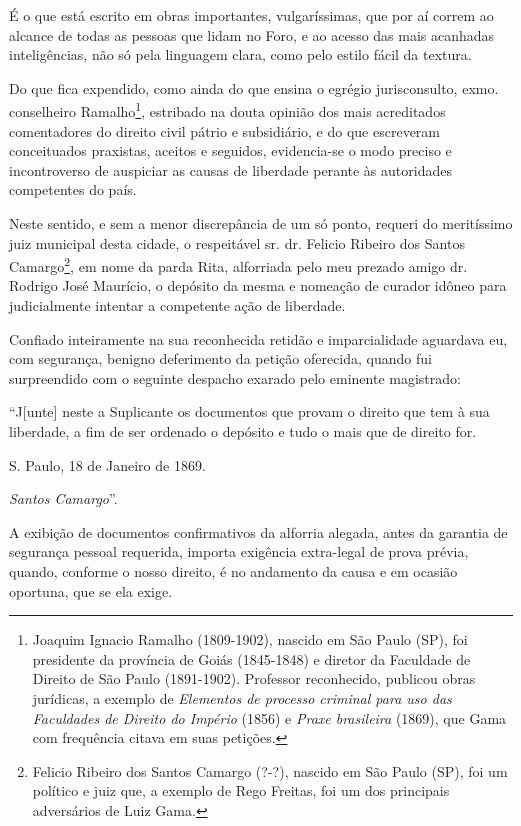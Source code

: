É o que está escrito em obras importantes, vulgaríssimas, que por aí
correm ao alcance de todas as pessoas que lidam no Foro, e ao acesso das
mais acanhadas inteligências, não só pela linguagem clara, como pelo
estilo fácil da textura.

Do que fica expendido, como ainda do que ensina o egrégio jurisconsulto,
exmo. conselheiro Ramalho\footnote{Joaquim Ignacio Ramalho
  (1809-1902), nascido em São Paulo (SP), foi presidente da província de
  Goiás (1845-1848) e diretor da Faculdade de Direito de São Paulo
  (1891-1902). Professor reconhecido, publicou obras jurídicas, a
  exemplo de \emph{Elementos de processo criminal para uso das
  Faculdades de Direito do Império} (1856) e \emph{Praxe brasileira}
  (1869), que Gama com frequência citava em suas petições.}, estribado
na douta opinião dos mais acreditados comentadores do direito civil
pátrio e subsidiário, e do que escreveram conceituados praxistas,
aceitos e seguidos, evidencia-se o modo preciso e incontroverso de
auspiciar as causas de liberdade perante às autoridades competentes do
país.

Neste sentido, e sem a menor discrepância de um só ponto, requeri do
meritíssimo juiz municipal desta cidade, o respeitável sr. dr. Felicio
Ribeiro dos Santos Camargo\footnote{Felicio Ribeiro dos Santos Camargo
  (?-?), nascido em São Paulo (SP), foi um político e juiz que, a
  exemplo de Rego Freitas, foi um dos principais adversários de Luiz
  Gama.}, em nome da parda Rita, alforriada pelo meu prezado amigo dr.
Rodrigo José Maurício, o depósito da mesma e nomeação de curador idôneo
para judicialmente intentar a competente ação de liberdade.

Confiado inteiramente na sua reconhecida retidão e imparcialidade
aguardava eu, com segurança, benigno deferimento da petição oferecida,
quando fui surpreendido com o seguinte despacho exarado pelo eminente
magistrado:

``J{[}unte{]} neste a Suplicante os documentos que provam o direito que
tem à sua liberdade, a fim de ser ordenado o depósito e tudo o mais que
de direito for.

S. Paulo, 18 de Janeiro de 1869.

\emph{Santos Camargo}''.

A exibição de documentos confirmativos da alforria alegada, antes da
garantia de segurança pessoal requerida, importa exigência extra-legal
de prova prévia, quando, conforme o nosso direito, é no andamento da
causa e em ocasião oportuna, que se ela exige.

